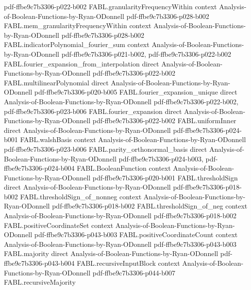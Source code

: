 \begin{theorem}
  {pdf-ffbe9c7b3306-p022-b002}
\proofstep
  {FABL.granularityFrequencyWithin}
  {context}
  {Analysis-of-Boolean-Functions-by-Ryan-ODonnell}
  {pdf-ffbe9c7b3306-p028-b002}
\proofstep
  {FABL.mem_granularityFrequencyWithin}
  {context}
  {Analysis-of-Boolean-Functions-by-Ryan-ODonnell}
  {pdf-ffbe9c7b3306-p028-b002}
\proofstep
  {FABL.indicatorPolynomial_fourier_sum}
  {context}
  {Analysis-of-Boolean-Functions-by-Ryan-ODonnell}
  {pdf-ffbe9c7b3306-p021-b002,
    pdf-ffbe9c7b3306-p022-b002}
\proofstep
  {FABL.fourier_expansion_from_interpolation}
  {direct}
  {Analysis-of-Boolean-Functions-by-Ryan-ODonnell}
  {pdf-ffbe9c7b3306-p022-b002}
\proofstep
  {FABL.multilinearPolynomial}
  {direct}
  {Analysis-of-Boolean-Functions-by-Ryan-ODonnell}
  {pdf-ffbe9c7b3306-p020-b005}
\proofstep
  {FABL.fourier_expansion_unique}
  {direct}
  {Analysis-of-Boolean-Functions-by-Ryan-ODonnell}
  {pdf-ffbe9c7b3306-p022-b002,
    pdf-ffbe9c7b3306-p023-b006}
\proofstep
  {FABL.fourier_expansion}
  {direct}
  {Analysis-of-Boolean-Functions-by-Ryan-ODonnell}
  {pdf-ffbe9c7b3306-p022-b002}
\proofstep
  {FABL.uniformInner}
  {direct}
  {Analysis-of-Boolean-Functions-by-Ryan-ODonnell}
  {pdf-ffbe9c7b3306-p024-b001}
\proofstep
  {FABL.walshBasis}
  {context}
  {Analysis-of-Boolean-Functions-by-Ryan-ODonnell}
  {pdf-ffbe9c7b3306-p023-b006}
\proofstep
  {FABL.parity_orthonormal_basis}
  {direct}
  {Analysis-of-Boolean-Functions-by-Ryan-ODonnell}
  {pdf-ffbe9c7b3306-p024-b003,
    pdf-ffbe9c7b3306-p024-b004}
\proofstep
  {FABL.BooleanFunction}
  {context}
  {Analysis-of-Boolean-Functions-by-Ryan-ODonnell}
  {pdf-ffbe9c7b3306-p020-b001}
\proofstep
  {FABL.thresholdSign}
  {direct}
  {Analysis-of-Boolean-Functions-by-Ryan-ODonnell}
  {pdf-ffbe9c7b3306-p018-b002}
\proofstep
  {FABL.thresholdSign_of_nonneg}
  {context}
  {Analysis-of-Boolean-Functions-by-Ryan-ODonnell}
  {pdf-ffbe9c7b3306-p018-b002}
\proofstep
  {FABL.thresholdSign_of_neg}
  {context}
  {Analysis-of-Boolean-Functions-by-Ryan-ODonnell}
  {pdf-ffbe9c7b3306-p018-b002}
\proofstep
  {FABL.positiveCoordinateSet}
  {context}
  {Analysis-of-Boolean-Functions-by-Ryan-ODonnell}
  {pdf-ffbe9c7b3306-p043-b003}
\proofstep
  {FABL.positiveCoordinateCount}
  {context}
  {Analysis-of-Boolean-Functions-by-Ryan-ODonnell}
  {pdf-ffbe9c7b3306-p043-b003}
\proofstep
  {FABL.majority}
  {direct}
  {Analysis-of-Boolean-Functions-by-Ryan-ODonnell}
  {pdf-ffbe9c7b3306-p043-b004}
\proofstep
  {FABL.recursiveInputBlock}
  {context}
  {Analysis-of-Boolean-Functions-by-Ryan-ODonnell}
  {pdf-ffbe9c7b3306-p044-b007}
\proofstep
  {FABL.recursiveMajority}

\end{theorem}

